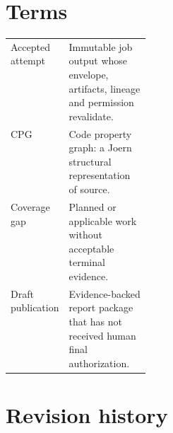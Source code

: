 \documentclass[10pt,a4paper]{article}
\begin{document}
\section{Terms}
\begin{tabularx}{\linewidth}{@{}p{0.23\linewidth}X@{}}
\toprule
Accepted attempt & Immutable job output whose envelope, artifacts, lineage and permission revalidate.\\
CPG & Code property graph: a Joern structural representation of source.\\
Coverage gap & Planned or applicable work without acceptable terminal evidence.\\
Draft publication & Evidence-backed report package that has not received human final authorization.\\
\bottomrule
\end{tabularx}

\section{Revision history}
\begin{revisions}
\end{revisions}
\end{document}
